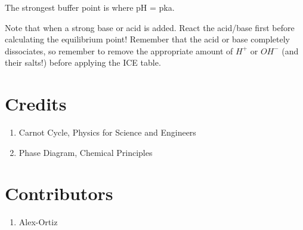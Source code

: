 \documentclass{article}
\begin{document}
The strongest buffer point is where pH = pka.

Note that when a strong base or acid is added. React the acid/base first before calculating the equilibrium point! Remember that the acid or base completely dissociates, so remember to remove the appropriate amount of $H^+$ or $OH^-$ (and their salts!) before applying the ICE table.




\section{Credits}
\begin{enumerate}
\item Carnot Cycle, Physics for Science and Engineers
\item Phase Diagram, Chemical Principles
\end{enumerate}

\section{Contributors}
\begin{enumerate}
\item Alex-Ortiz

\end{enumerate}
\end{document}
